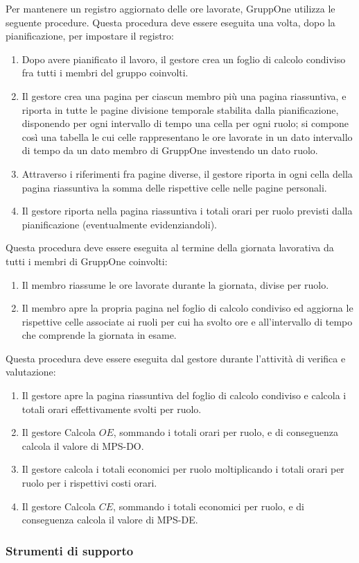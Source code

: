 \documentclass[../../norme-di-progetto.tex]{subfiles}
\begin{document}
Per mantenere un registro aggiornato delle ore lavorate, GruppOne utilizza le seguente procedure.
Questa procedura deve essere eseguita una volta, dopo la pianificazione, per impostare il registro:

\begin{enumerate}
  \item Dopo avere pianificato il lavoro, il gestore crea un foglio di calcolo condiviso fra tutti i membri del gruppo coinvolti.
  \item Il gestore crea una pagina per ciascun membro più una pagina riassuntiva, e riporta in tutte le pagine divisione temporale stabilita dalla pianificazione, disponendo per ogni intervallo di tempo una cella per ogni ruolo; si compone così una tabella le cui celle rappresentano le ore lavorate in un dato intervallo di tempo da un dato membro di GruppOne investendo un dato ruolo.
  \item Attraverso i riferimenti fra pagine diverse, il gestore riporta in ogni cella della pagina riassuntiva la somma delle rispettive celle nelle pagine personali.
  \item Il gestore riporta nella pagina riassuntiva i totali orari per ruolo previsti dalla pianificazione (eventualmente evidenziandoli).
\end{enumerate}

Questa procedura deve essere eseguita al termine della giornata lavorativa da tutti i membri di GruppOne coinvolti:

\begin{enumerate}
  \item Il membro riassume le ore lavorate durante la giornata, divise per ruolo.
  \item Il membro apre la propria pagina nel foglio di calcolo condiviso ed aggiorna le rispettive celle associate ai ruoli per cui ha svolto ore e all'intervallo di tempo che comprende la giornata in esame.
\end{enumerate}

Questa procedura deve essere eseguita dal gestore durante l'attività di verifica e valutazione:

\begin{enumerate}
  \item Il gestore apre la pagina riassuntiva del foglio di calcolo condiviso e calcola i totali orari effettivamente svolti per ruolo.
  \item Il gestore Calcola \(OE\), sommando i totali orari per ruolo, e di conseguenza calcola il valore di MPS-DO\@.
  \item Il gestore calcola i totali economici per ruolo moltiplicando i totali orari per ruolo per i rispettivi costi orari.
  \item Il gestore Calcola \(CE\), sommando i totali economici per ruolo, e di conseguenza calcola il valore di MPS-DE\@.
\end{enumerate}

\subsubsection{Strumenti di supporto}%
\label{subs:gestione-di-processo/strumenti_di_supporto}
\end{document}
